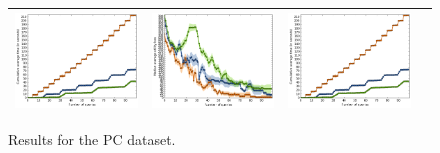 \documentclass{article}
\renewcommand\[{\begin{equation}}
\renewcommand\]{\end{equation}}
\begin{document}
\begin{figure}[b]
{\begin{tabular}{cccc}
        \includegraphics[width=10em]{figures/time} &
        \includegraphics[width=10em]{figures/loss} &
        \includegraphics[width=10em]{figures/time}
        \\
        \hline
    \end{tabular}
    }
    \caption{Results for the PC dataset.}
\end{figure}

\twocolumn
\end{document}
